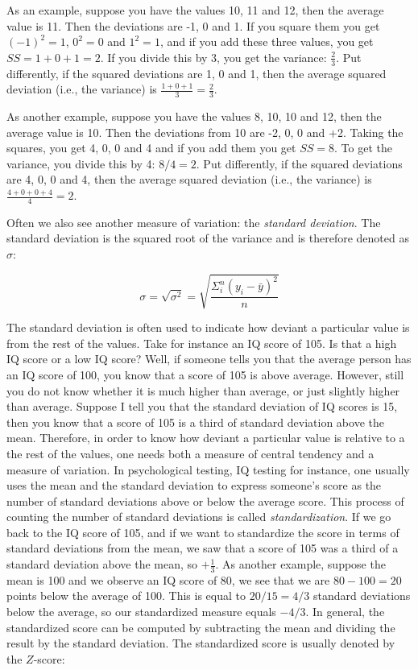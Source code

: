 \documentclass[]{book}\usepackage[]{graphicx}\usepackage[]{color}
\begin{document}
As an example, suppose you have the values 10, 11 and 12, then the average value is 11. Then the deviations are -1, 0 and 1. If you square them you get $(-1)^2=1$, $0^2=0$ and $1^2=1$, and if you add these three values, you get $SS=1+0+1=2$. If you divide this by 3, you get the variance: $\frac{2}{3}$. Put differently, if the squared deviations are 1, 0 and 1, then the average squared deviation (i.e., the variance) is $\frac{1+0+1}{3}=\frac{2}{3}$.

As another example, suppose you have the values 8, 10, 10 and 12, then the average value is 10. Then the deviations from 10 are -2, 0, 0 and +2. Taking the squares, you get 4, 0, 0 and 4 and if you add them you get $SS=8$. To get the variance, you divide this by 4: $8/4=2$. Put differently, if the squared deviations are 4, 0, 0 and 4, then the average squared deviation (i.e., the variance) is $\frac{4+0+0+4}{4}=2$.

Often we also see another measure of variation: the \textit{standard deviation}. The standard deviation is the squared root of the variance and is therefore denoted as $\sigma$:

\begin{equation}
\sigma = \sqrt{\sigma^2}=\sqrt{  \frac{\Sigma_i^n (y_i-\bar{y})^2}{n}}
\end{equation}

The standard deviation is often used to indicate how deviant a particular value is from the rest of the values. Take for instance an IQ score of 105. Is that a high IQ score or a low IQ score? Well, if someone tells you that the average person has an IQ score of 100, you know that a score of 105 is above average. However, still you do not know whether it is much higher than average, or just slightly higher than average. Suppose I tell you that the standard deviation of IQ scores is 15, then you know that a score of 105 is a third of standard deviation above the mean. Therefore, in order to know how deviant a particular value is relative to a the rest of the values, one needs both a measure of central tendency and a measure of variation. In psychological testing, IQ testing for instance, one usually uses the mean and the standard deviation to express someone's score as the number of standard deviations above or below the average score. This process of counting the number of standard deviations is called \textit{standardization}. If we go back to the IQ score of 105, and if we want to standardize the score in terms of standard deviations from the mean, we saw that a score of 105 was a third of a standard deviation above the mean, so $+\frac{1}{3}$. As another example, suppose the mean is 100 and we observe an IQ score of 80, we see that we are $80-100=20$ points below the average of 100. This is equal to $20/15=4/3$ standard deviations below the average, so our standardized measure equals $-4/3$. In general, the standardized score can be computed by subtracting the mean and dividing the result by the standard deviation. The standardized score is usually denoted by the $Z$-score:
\end{document}
